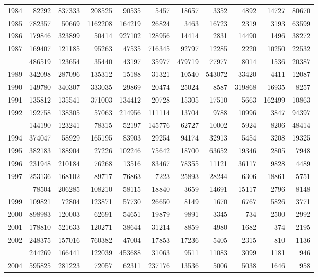 \documentclass[
]{article}
\begin{document}
\begin{longtable}[t]{lrrrrrrrrrr}
1984 & 82292 & 837333 & 208525 & 90535 & 5457 & 18657 & 3352 & 4892 & 14727 & 80670\\
1985 & 782357 & 50669 & 1162208 & 164219 & 26824 & 3463 & 16723 & 2319 & 3193 & 63599\\
1986 & 179846 & 323899 & 50414 & 927102 & 128956 & 14414 & 2831 & 14490 & 1496 & 38272\\
1987 & 169407 & 121185 & 95263 & 47535 & 716345 & 92797 & 12285 & 2220 & 10250 & 22532\\
\addlinespace
1988 & 486519 & 123654 & 35440 & 43197 & 35977 & 479719 & 77977 & 8014 & 1536 & 20387\\
1989 & 342098 & 287096 & 135312 & 15188 & 31321 & 10540 & 543072 & 33420 & 4411 & 12087\\
1990 & 149780 & 340307 & 333035 & 29869 & 20474 & 25024 & 8587 & 319868 & 16935 & 8257\\
1991 & 135812 & 135541 & 371003 & 134412 & 20728 & 15305 & 17510 & 5663 & 162499 & 10863\\
1992 & 192758 & 138305 & 57063 & 214956 & 111114 & 13704 & 9788 & 10996 & 3847 & 94397\\
\addlinespace
1993 & 144190 & 123241 & 78315 & 52197 & 145776 & 62727 & 10002 & 5924 & 8206 & 48414\\
1994 & 374047 & 58929 & 165195 & 83903 & 29254 & 94174 & 32913 & 5454 & 3208 & 19325\\
1995 & 382183 & 188904 & 27226 & 102246 & 75642 & 18700 & 63652 & 19346 & 2805 & 7948\\
1996 & 231948 & 210184 & 76268 & 13516 & 83467 & 78355 & 11121 & 36117 & 9828 & 4489\\
1997 & 253136 & 168102 & 89717 & 76863 & 7223 & 25893 & 28244 & 6306 & 18861 & 5751\\
\addlinespace
1998 & 78504 & 206285 & 108210 & 58115 & 18840 & 3659 & 14691 & 15117 & 2796 & 8148\\
1999 & 109821 & 72804 & 123871 & 57730 & 26650 & 8149 & 1670 & 6767 & 5826 & 3771\\
2000 & 898983 & 120003 & 62691 & 54651 & 19879 & 9891 & 3345 & 734 & 2500 & 2992\\
2001 & 178810 & 521633 & 120271 & 38644 & 31214 & 8859 & 4980 & 1682 & 374 & 2195\\
2002 & 248375 & 157016 & 760382 & 47004 & 17853 & 17236 & 5405 & 2315 & 810 & 1136\\
\addlinespace
2003 & 244269 & 166441 & 122039 & 453688 & 31063 & 9511 & 11083 & 3099 & 1181 & 946\\
2004 & 595825 & 281223 & 72057 & 62311 & 237176 & 13536 & 5006 & 5038 & 1646 & 958\\

\end{longtable}
\end{document}

